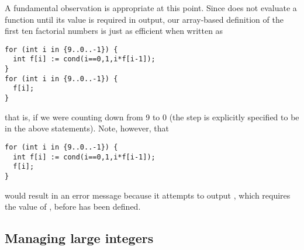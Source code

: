 A fundamental observation is appropriate at this point.
Since {\smart} does not evaluate a function until its value is required in
output, our array-based definition of the first ten factorial numbers
is just as efficient when written as
\begin{lstlisting}
for (int i in {9..0..-1}) {
  int f[i] := cond(i==0,1,i*f[i-1]);
}
for (int i in {9..0..-1}) {
  f[i];
}
\end{lstlisting}
that is, if we were counting  down from 9 to 0
(the step is explicitly specified to be  in
the above  statements).
Note, however, that
\begin{lstlisting}
for (int i in {9..0..-1}) {
  int f[i] := cond(i==0,1,i*f[i-1]);
  f[i];
}
\end{lstlisting}
would result in an error message because it attempts to output
, which requires the value of , before
 has been defined.





\subsection{Managing large integers}

